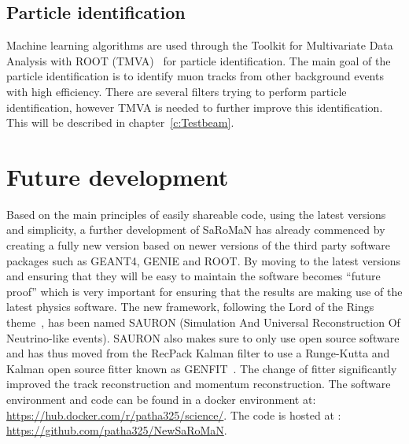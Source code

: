 \subsection{Particle identification}
Machine learning algorithms are used through the Toolkit for Multivariate Data Analysis with ROOT (TMVA)~\cite{TMVA} for particle identification. The main goal of the particle identification is to identify muon tracks from other background events with high efficiency. There are several filters trying to perform particle identification, however TMVA is needed to further improve this identification. This will be described in chapter~\ref{c:Testbeam}.



\section{Future development}
Based on the main principles of easily shareable code, using the latest versions and simplicity, a further development of SaRoMaN has already commenced by creating a fully new version based on newer versions of the third party software packages such as GEANT4, GENIE and ROOT. By moving to the latest versions and ensuring that they will be easy to maintain the software becomes ``future proof'' which is very important for ensuring that the results are making use of the latest physics software. The new framework, following the Lord of the Rings theme~\cite{79tolkien2012lord}, has been named SAURON (Simulation And Universal Reconstruction Of Neutrino-like events). SAURON also makes sure to only use open source software and has thus moved from the RecPack Kalman filter to use a Runge-Kutta and Kalman open source fitter known as GENFIT~\cite{81Genfit}. The change of fitter significantly improved the track reconstruction and momentum reconstruction.
The software environment and code can be found in a docker environment at: \url{https://hub.docker.com/r/patha325/science/}. The code is hosted at : \url{https://github.com/patha325/NewSaRoMaN}.

